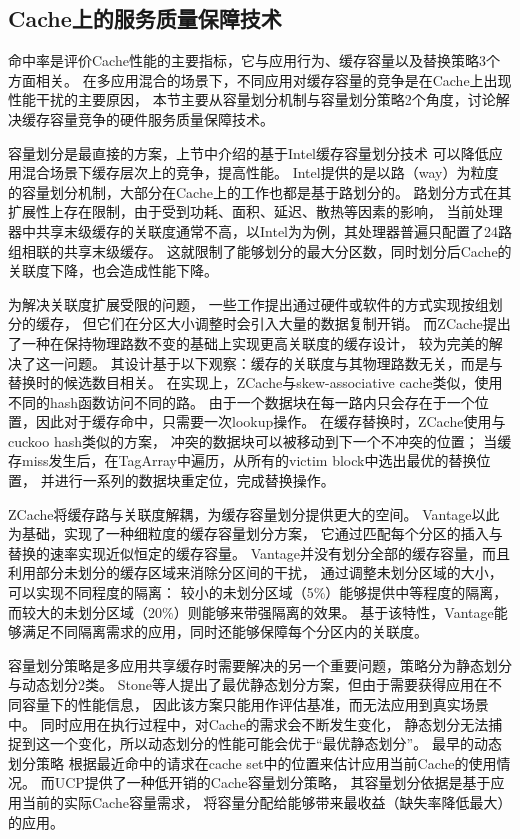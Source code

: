 \subsection{Cache上的服务质量保障技术}

命中率是评价Cache性能的主要指标，它与应用行为、缓存容量以及替换策略3个方面相关。
在多应用混合的场景下，不同应用对缓存容量的竞争是在Cache上出现性能干扰的主要原因，
本节主要从容量划分机制与容量划分策略2个角度，讨论解决缓存容量竞争的硬件服务质量保障技术。

容量划分是最直接的方案，上节中介绍的基于Intel缓存容量划分技术\cite{cook_hardware_2013}
可以降低应用混合场景下缓存层次上的竞争，提高性能。
Intel提供的是以路（way）为粒度的容量划分机制，大部分在Cache上的工作也都是基于路划分的。%
路划分方式在其扩展性上存在限制，由于受到功耗、面积、延迟、散热等因素的影响，
当前处理器中共享末级缓存的关联度通常不高，以Intel为为例，其处理器普遍只配置了24路组相联的共享末级缓存。
这就限制了能够划分的最大分区数，同时划分后Cache的关联度下降，也会造成性能下降。

为解决关联度扩展受限的问题，
一些工作提出通过硬件\cite{Ranganathan:2000}或软件\cite{lin_gaining_2008}的方式实现按组划分的缓存，
但它们在分区大小调整时会引入大量的数据复制开销。
而ZCache\cite{sanchez_zcache:_2010}提出了一种在保持物理路数不变的基础上实现更高关联度的缓存设计，
较为完美的解决了这一问题。
其设计基于以下观察：缓存的关联度与其物理路数无关，而是与替换时的候选数目相关。
在实现上，ZCache与skew-associative cache\cite{skewed-cache}类似，使用不同的hash函数访问不同的路。
由于一个数据块在每一路内只会存在于一个位置，因此对于缓存命中，只需要一次lookup操作。
在缓存替换时，ZCache使用与cuckoo hash\cite{cuckoo}类似的方案，
冲突的数据块可以被移动到下一个不冲突的位置；
当缓存miss发生后，在TagArray中遍历，从所有的victim block中选出最优的替换位置，
并进行一系列的数据块重定位，完成替换操作。

ZCache将缓存路与关联度解耦，为缓存容量划分提供更大的空间。
Vantage\cite{sanchez_vantage:_2011}以此为基础，实现了一种细粒度的缓存容量划分方案，
它通过匹配每个分区的插入与替换的速率实现近似恒定的缓存容量。
Vantage并没有划分全部的缓存容量，而且利用部分未划分的缓存区域来消除分区间的干扰，
通过调整未划分区域的大小，可以实现不同程度的隔离：
较小的未划分区域（5\%）能够提供中等程度的隔离，
而较大的未划分区域（20\%）则能够来带强隔离的效果。
基于该特性，Vantage能够满足不同隔离需求的应用，同时还能够保障每个分区内的关联度。

容量划分策略是多应用共享缓存时需要解决的另一个重要问题，策略分为静态划分与动态划分2类。
Stone等人提出了最优静态划分方案\cite{stone:1992}，但由于需要获得应用在不同容量下的性能信息，
因此该方案只能用作评估基准，而无法应用到真实场景中。
同时应用在执行过程中，对Cache的需求会不断发生变化，
静态划分无法捕捉到这一个变化，所以动态划分的性能可能会优于``最优静态划分''。
最早的动态划分策略\cite{suh:2004}
根据最近命中的请求在cache set中的位置来估计应用当前Cache的使用情况。
而UCP\cite{qureshi_utility-based_2006}提供了一种低开销的Cache容量划分策略，
其容量划分依据是基于应用当前的实际Cache容量需求，
将容量分配给能够带来最收益（缺失率降低最大）的应用。

